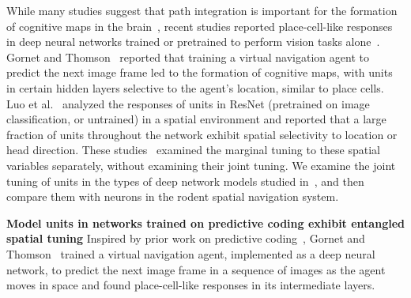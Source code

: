 \documentclass[11pt]{article}
\begin{document}
While many studies suggest that path integration is important for the formation of cognitive maps in the brain~\cite{Mcnaughton2006,Burak2009,Cueva2018}, recent studies reported place-cell-like responses in deep neural networks trained or pretrained to perform vision tasks alone~\cite{Luo2024,Gornet2024automated}. Gornet and Thomson~\cite{Gornet2024automated} reported that training a virtual navigation agent to predict the next image frame led to the formation of cognitive maps, with units in certain hidden layers selective to the agent's location, similar to place cells. Luo et al.~\cite{Luo2024} analyzed the responses of units in ResNet (pretrained on image classification, or untrained) in a spatial environment and reported that a large fraction of units throughout the network exhibit spatial selectivity to location or head direction. These studies~\cite{Luo2024,Gornet2024automated} examined the marginal tuning to these spatial variables separately, without examining their joint tuning.
We examine the joint tuning of units in the types of deep network models studied in~\cite{Luo2024,Gornet2024automated}, and then compare them with neurons in the rodent spatial navigation system.

{\bf Model units in networks trained on predictive coding exhibit entangled spatial tuning}
Inspired by prior work on predictive coding~\cite{Srinivasan1982predictive,Rao1999predictive}, Gornet and Thomson~\cite{Gornet2024automated} trained a virtual navigation agent, implemented as a deep neural network, to predict the next image frame in a sequence of images as the agent moves in space and found place-cell-like responses in its intermediate layers.
\end{document}
